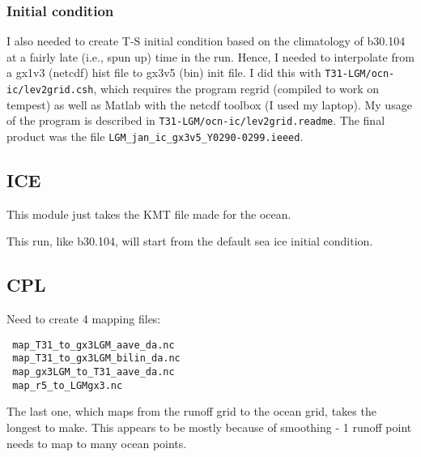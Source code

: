 \documentclass[authoryear,round,12pt]{article}
\begin{document}
\subsubsection{Initial condition}

I also needed to create T-S initial condition based on the climatology
of b30.104 at a fairly late (i.e., spun up) time in the run. Hence, I
needed to interpolate from a gx1v3 (netcdf) hist file to gx3v5 (bin)
init file. I did this with \verb+T31-LGM/ocn-ic/lev2grid.csh+, which
requires the program regrid (compiled to work on tempest) as well as
Matlab with the netcdf toolbox (I used my laptop). My usage of the
program is described in \verb+T31-LGM/ocn-ic/lev2grid.readme+. The
final product was the file \verb+LGM_jan_ic_gx3v5_Y0290-0299.ieeed+.

\subsection{ICE}

This module just takes the KMT file made for the ocean.

This run, like b30.104, will start from the default sea ice initial
condition.

\subsection{CPL}

Need to create 4 mapping files:

\begin{verbatim}
 map_T31_to_gx3LGM_aave_da.nc
 map_T31_to_gx3LGM_bilin_da.nc
 map_gx3LGM_to_T31_aave_da.nc
 map_r5_to_LGMgx3.nc
\end{verbatim}

The last one, which maps from the runoff grid to the ocean grid, takes
the longest to make. This appears to be mostly because of smoothing -
1 runoff point needs to map to many ocean points.
\end{document}
